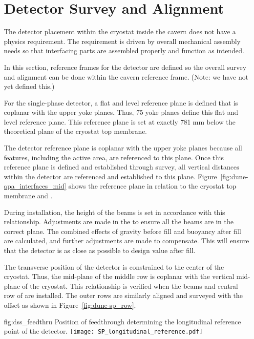 \section{Detector Survey and Alignment}
\label{sec:fdsp-coord-integ-survey}
The detector placement within the cryostat inside the
cavern does not have a physics requirement. The requirement is driven
by overall mechanical assembly needs so that interfacing
parts are assembled properly and function as intended.


In this section, reference frames for the detector are defined so the overall survey and alignment can be done within
the cavern reference frame. (Note: we have not yet defined this.)


For the single-phase detector, a flat and level reference  plane is
defined that is coplanar with the upper  yoke
planes. Thus, 75 yoke planes define this flat and
level reference  plane. This reference plane is set at exactly 781 mm below the
theoretical plane of the cryostat top membrane.


The detector reference plane is coplanar with the upper
 yoke planes because all features, including
the active area, are referenced  to this plane.  Once this reference
plane is defined and established through survey, all vertical
distances within the detector are referenced  and established to this
plane.  Figure~\ref{fig:dune-apa_interfaces_mid} shows the reference
plane in relation to the cryostat top membrane and .


During installation, the height of the  beams
is set in accordance with this relationship. Adjustments are made in the
 to ensure all the beams are in the
correct plane. The combined effects of gravity before fill and
buoyancy after fill are calculated, and further adjustments are made
to compensate. This will ensure that the detector is as close as
possible to design value after fill.


The transverse position of the detector is constrained to the
center of the cryostat. Thus, the mid-plane of the middle row  is coplanar with the vertical mid-plane of the
cryostat. This relationship is verified when the
 beams and central row of  are installed. The outer rows are similarly aligned and surveyed with the
offset as shown in Figure~\ref{fig:dune-sp_row}.
\begin{dunefigure}{fig:dss_feedthru}
  {Position of feedthrough determining the longitudinal reference point of the detector.}
  \texttt{[image: SP\_longitudinal\_reference.pdf]}
\end{dunefigure}




